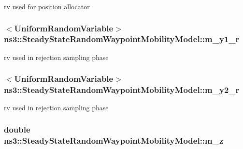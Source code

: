 rv used for position allocator 

\subsubsection[{\texorpdfstring{m\+\_\+y1\+\_\+r}{m_y1_r}}]{$<${\bf Uniform\+Random\+Variable}$>$ ns3\+::\+Steady\+State\+Random\+Waypoint\+Mobility\+Model\+::m\+\_\+y1\+\_\+r\hspace{0.3cm}{\ttfamily [private]}}\hypertarget{classns3_1_1SteadyStateRandomWaypointMobilityModel_adb2d5dc1a84e75615445b99d6b644f9b}{}\label{classns3_1_1SteadyStateRandomWaypointMobilityModel_adb2d5dc1a84e75615445b99d6b644f9b}


rv used in rejection sampling phase 

\subsubsection[{\texorpdfstring{m\+\_\+y2\+\_\+r}{m_y2_r}}]{$<${\bf Uniform\+Random\+Variable}$>$ ns3\+::\+Steady\+State\+Random\+Waypoint\+Mobility\+Model\+::m\+\_\+y2\+\_\+r\hspace{0.3cm}{\ttfamily [private]}}\hypertarget{classns3_1_1SteadyStateRandomWaypointMobilityModel_a45e27842ca089b8828735d15795ed680}{}\label{classns3_1_1SteadyStateRandomWaypointMobilityModel_a45e27842ca089b8828735d15795ed680}


rv used in rejection sampling phase 

\subsubsection[{\texorpdfstring{m\+\_\+z}{m_z}}]{\setlength{\rightskip}{0pt plus 5cm}double ns3\+::\+Steady\+State\+Random\+Waypoint\+Mobility\+Model\+::m\+\_\+z\hspace{0.3cm}{\ttfamily [private]}}\hypertarget{classns3_1_1SteadyStateRandomWaypointMobilityModel_a702c7ffbfca3cea2b53e5fe671fd973d}{}\label{classns3_1_1SteadyStateRandomWaypointMobilityModel_a702c7ffbfca3cea2b53e5fe671fd973d}


